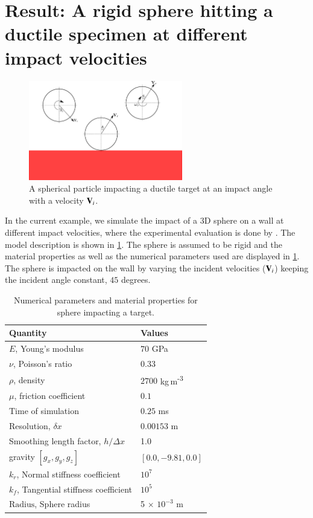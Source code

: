 \section{Result: A rigid sphere hitting a ductile specimen at different impact velocities}
\label{sec:r-vyas}
\begin{figure}[!htpb]
  \centering
  \includegraphics[width=0.6\textwidth]{images/erosion/images/vyas_2021_rebound_kinematics_3d/cao_drawing}
  \caption{A spherical particle impacting a ductile target at an impact angle
    with a velocity $\mathbf{V}_i$.}
\label{fig:results-cao-3d-erosion-schematic}
\end{figure}
In the current example, we simulate the impact of a 3D sphere on a wall at
different impact velocities, where the experimental evaluation is done by
\cite{zang2022investigation}. The model description is shown in
\cref{fig:results-cao-3d-erosion-schematic}. The sphere is assumed to be
rigid and the material properties as well as the numerical parameters used are
displayed in \cref{tab:sphere-target-impact}. The sphere is impacted on the wall
by varying the incident velocities ($\mathbf{V}_i$) keeping the incident angle constant,
$45$ degrees.
\begin{table}[!ht]
  \centering
  \begin{tabular}[!ht]{ll}
    \toprule
    Quantity & Values\\
    \midrule
    $E$, Young's modulus & $70$ GPa \\
    $\nu$, Poisson's ratio & $0.33$ \\
    $\rho$, density & $2700$ kg\,m\textsuperscript{-3} \\
    $\mu$, friction coefficient & $0.1$ \\
    Time of simulation & $0.25$ ms \\
    Resolution, $\delta x$ & $0.00153$ m\\
    Smoothing length factor, $h/\Delta x$ & 1.0\\
    gravity $[g_x, g_y, g_z]$ & $[0.0, -9.81, 0.0]$\\
    $k_r$, Normal stiffness coefficient & $10^{7}$ \\
    $k_f$, Tangential stiffness coefficient & $10^{5}$ \\
    $\text{Radius}$, Sphere radius & 5 $\times$ $10^{-3}$ m\\
    \bottomrule
  \end{tabular}
  \caption{Numerical parameters and material properties for sphere impacting a target.}%
  \label{tab:sphere-target-impact}
\end{table}



